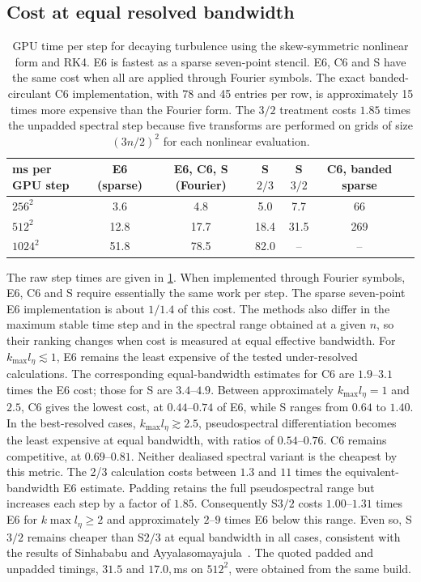 \documentclass[11pt,a4paper]{article}
\begin{document}
\subsection{Cost at equal resolved bandwidth}
\begin{table}[t]
\centering\small
\begin{tabular}{lcccccc}
\toprule
ms per GPU step & E6 (sparse) & E6, C6, S (Fourier) & S${2/3}$ & S${3/2}$ & C6, banded sparse \\
\midrule
$256^2$ & 3.6 & 4.8 & 5.0 & 7.7 & 66 \\
$512^2$ & 12.8 & 17.7 & 18.4 & 31.5 & 269 \\
$1024^2$ & 51.8 & 78.5 & 82.0 & -- & -- \\
\bottomrule
\end{tabular}
\caption{GPU time per step for decaying turbulence using the skew-symmetric nonlinear form and RK4. E6 is fastest as a sparse seven-point stencil. E6, C6 and S have the same cost when all are applied through Fourier symbols. The exact banded-circulant C6 implementation, with 78 and 45 entries per row, is approximately 15 times more expensive than the Fourier form. The $3/2$ treatment costs $1.85$ times the unpadded spectral step because five transforms are performed on grids of size $(3n/2)^2$ for each nonlinear evaluation.}
\label{tab:time}
\end{table}
The raw step times are given in \cref{tab:time}. When implemented through Fourier symbols, E6, C6 and S require essentially the same work per step. The sparse seven-point E6 implementation is about $1/1.4$ of this cost. The methods also differ in the maximum stable time step and in the spectral range obtained at a given $n$, so their ranking changes when cost is measured at equal effective bandwidth.
For $k_{\max}l_\eta\lesssim1$, E6 remains the least expensive of the tested under-resolved calculations. The corresponding equal-bandwidth estimates for C6 are $1.9$--$3.1$ times the E6 cost; those for S are $3.4$--$4.9$. Between approximately $k_{\max}l_\eta=1$ and $2.5$, C6 gives the lowest cost, at $0.44$--$0.74$ of E6, while S ranges from $0.64$ to $1.40$. In the best-resolved cases, $k_{\max}l_\eta\gtrsim2.5$, pseudospectral differentiation becomes the least expensive at equal bandwidth, with ratios of $0.54$--$0.76$. C6 remains competitive, at $0.69$--$0.81$.
Neither dealiased spectral variant is the cheapest by this metric. The 2/3 calculation costs between $1.3$ and $11$ times the equivalent-bandwidth E6 estimate. Padding retains the full pseudospectral range but increases each step by a factor of $1.85$. Consequently S${3/2}$ costs $1.00$--$1.31$ times E6 for $k{\max}l_\eta\ge2$ and approximately $2$--$9$ times E6 below this range. Even so, S${3/2}$ remains cheaper than S${2/3}$ at equal bandwidth in all cases, consistent with the results of Sinhababu and Ayyalasomayajula~\cite{sinhababu2021}. The quoted padded and unpadded timings, $31.5$ and $17.0,$ms on $512^2$, were obtained from the same build.
\end{document}
